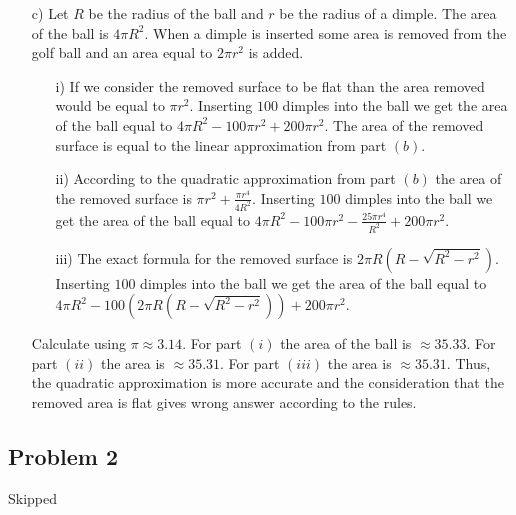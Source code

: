 \documentclass{article}
\begin{document}
\begin{itemize}
    \item[c)] Let $R$ be the radius of the ball and $r$ be the radius of a dimple. The area of the ball is $4 \pi R^2$. When a dimple is inserted some area is removed from the golf ball and an area equal to $2\pi r^2$ is added.
    \begin{itemize}
        \item[i)] If we consider the removed surface to be flat than the area removed would be equal to $\pi r^2$. Inserting $100$ dimples into the ball we get the area of the ball equal to $4 \pi R^2 - 100 \pi r^2 + 200 \pi r^2$. The area of the removed surface is equal to the linear approximation from part $(b)$.
        \item[ii)] According to the quadratic approximation from part $(b)$ the area of the removed surface is $\pi r^2 + \frac{\pi r^4}{4R^2}$. Inserting $100$ dimples into the ball we get the area of the ball equal to $4 \pi R^2 - 100 \pi r^2 - \frac{25\pi r^4}{R^2} + 200 \pi r^2$.
        \item[iii)] The exact formula for the removed surface is $2 \pi R \left(R - \sqrt{R^2 - r^2}\right)$. Inserting $100$ dimples into the ball we get the area of the ball equal to $4 \pi R^2 - 100\left(2 \pi R \left(R - \sqrt{R^2 - r^2}\right)\right) + 200 \pi r^2$. 
    \end{itemize}
    Calculate using $\pi \approx 3.14$. For part $(i)$ the area of the ball is $ \approx 35.33$. For part $(ii)$ the area is $\approx 35.31$. For part $(iii)$ the area is $\approx 35.31$. Thus, the quadratic approximation is more accurate and the consideration that the removed area is flat gives wrong answer according to the rules.
\end{itemize}
\subsection{Problem 2}
Skipped
\end{document}
